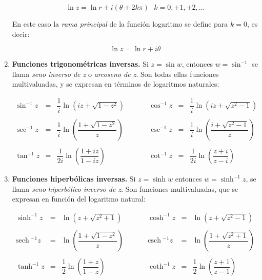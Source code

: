 \documentclass[12pt]{book}
\newcommand{\parentesis}[1]{\left( #1  \right)}
\newcommand{\sech}{\mathrm{sech} \ }
\newcommand{\csch}{\mathrm{csch} \ }
\begin{document}
\begin{enumerate}
\begin{equation}
\ln z = \ln r + i (\theta + 2k \pi) \ \ \ k = 0, \pm 1, \pm2, \ldots
\end{equation}

En este caso la \textit{rama principal} de la función logaritmo se define para $k=0$, es decir:

\begin{equation}
\ln z = \ln r + i \theta
\end{equation}


\item \textbf{Funciones trigonométricas inversas.} Si $z = \sin w$, entonces $w = \sin^{-1}$ se llama \textit{seno inverso de z} o \textit{arcoseno de z}. Son todas ellas funciones multivaluadas, y se expresan en términos de logaritmos naturales:

\begin{equation}
\begin{array}{cclccclc}

\sin^{-1} z & = & \dfrac{1}{i} \ln (i z + \sqrt{1-z^2}) & \ \ \ \ \ \ \ \ & \cos^{-1} z & = & \dfrac{1}{i} \ln (i z + \sqrt{z^2-1}) \\ \\

\sec^{-1} z & = & \dfrac{1}{i} \ln \parentesis{\dfrac{1 + \sqrt{1-z^2}}{z}} & \ \ & \csc^{-1} z & = & \dfrac{1}{i} \ln  \parentesis{\dfrac{i + \sqrt{z^2-1}}{z}} \\ \\

\tan^{-1} z & = & \dfrac{1}{2i} \ln  \parentesis{\dfrac{1 + i z}{1-iz}} & & \cot^{-1} z & = & \dfrac{1}{2i} \ln  \parentesis{\dfrac{z + i }{z-i}}

\end{array}
\end{equation}

\item \textbf{Funciones hiperbólicas inversas.} Si $z = \sinh w$ entonces $w = \sinh^{-1} z$, se llama \textit{seno hiperbólico inverso de z}. Son funciones multivaluadas, que se expresan en función del logaritmo natural:


\begin{equation}
\begin{array}{cclccclc}

\sinh^{-1} z & = & \ln (z + \sqrt{z^2+1}) & \ \ \ \ \ \ \ \ & \cosh^{-1} z & = & \ln (z + \sqrt{z^2-1}) \\ \\

\sech^{-1} z & = &  \ln \parentesis{\dfrac{1+\sqrt{1-z^2}}{z}} & \ & \csch^{-1} z& = & \ln \parentesis{\dfrac{1+\sqrt{z^2+1}}{z}} \\ \\

\tanh^{-1} z & = & \dfrac{1}{2} \ln  \parentesis{\dfrac{1 + z}{1-z}} & & \coth^{-1} z & = &  \dfrac{1}{2} \ln  \parentesis{\dfrac{z + 1 }{z-1}}

\end{array}
\end{equation}
\end{enumerate}
\end{document}
